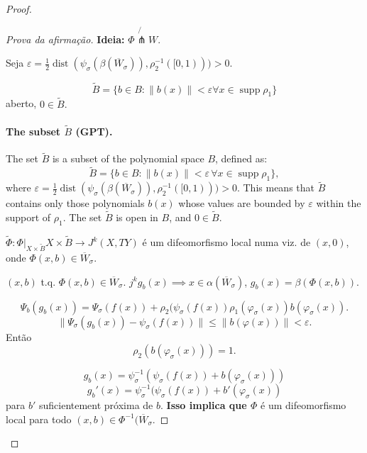 \begin{proof}
\begin{proof}[Prova da afirmação]
\textbf{Ideia:} \(\Phi \not{\pitchfork} W\).

Seja \(\varepsilon=\frac{1}{2}\operatorname{dist}(\psi_\sigma(\beta(\overline{W}_\sigma)),\rho^{-1}_2([0,1)))>0\).

\[\tilde{B}=\{b \in B: \|b(x)\|<\varepsilon \forall  x \in \operatorname{sup p} \rho_1\}\]
aberto, \(0 \in \tilde{B}.\)


\paragraph{The subset \(\tilde{B}\) (GPT).} 
The set \(\tilde{B}\) is a subset of the polynomial space \(B\), defined as:
\[
\tilde{B} = \{b \in B : \|b(x)\| < \varepsilon \, \forall x \in \operatorname{supp} \rho_1\},
\]
where \(\varepsilon = \frac{1}{2} \operatorname{dist}(\psi_\sigma(\beta(\overline{W}_\sigma)), \rho_2^{-1}([0,1))) > 0\). This means that \(\tilde{B}\) contains only those polynomials \(b(x)\) whose values are bounded by \(\varepsilon\) within the support of \(\rho_1\). The set \(\tilde{B}\) is open in \(B\), and \(0 \in \tilde{B}\).

\(\tilde{\Phi}:\Phi\Big|_{X \times \tilde{B}}X \times \tilde{B} \to J^k(X,TY)\) é um difeomorfismo local numa viz. de \((x,0)\), onde  \(\Phi(x,b) \in \overline{W}_\sigma.\)

\((x,b)\) t.q. \(\Phi(x,b) \in \overline{ W}_\sigma\). \(j^k g_b(x) \implies x \in \alpha (\overline{W}_\sigma)\), \(g_b(x)=\beta (\Phi(x,b))\).

\[\Psi_b(g_b(x))=\Psi_\sigma(f(x))+\rho_2(\psi_\sigma(f(x))\rho_1(\varphi_\sigma(x))b(\varphi_\sigma(x)).\]
\[\|\Psi_\sigma(g_b(x))-\psi_\sigma(f(x))\| \leq  \|b(\varphi(x))\|<\varepsilon.\]
Então
\[\rho_2(b(\varphi_\sigma(x)))=1.\]

\[g_b(x)=\psi^{-1}_\sigma(\psi_\sigma(f(x))+b(\varphi_\sigma(x)))\]
\[g_b'(x)=\psi^{-1}_\sigma(\psi_\sigma(f(x))+b'(\varphi_\sigma(x))\]
para \(b'\) suficientement próxima de  $b$. \textbf{Isso implica que \(\Phi\)} é um difeomorfismo local para todo \((x,b) \in \Phi^{-1}(\overline{W}_\sigma\).


\end{proof}
\end{proof}
